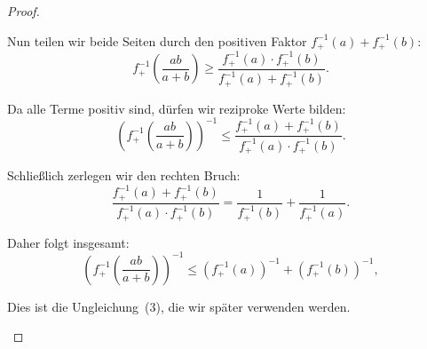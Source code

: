 \documentclass[
12pt,
fancyheadings, %
%
a4paper, 
%
]{tuhhreprt}
\begin{document}
\begin{proof}
\begin{enumerate}[label=\roman*)]
    Nun teilen wir beide Seiten durch den positiven Faktor \( f_+^{-1}(a) + f_+^{-1}(b) \):
    \[
    f_+^{-1}\left( \frac{ab}{a + b} \right) \geq \frac{f_+^{-1}(a) \cdot f_+^{-1}(b)}{f_+^{-1}(a) + f_+^{-1}(b)}.
    \]

    Da alle Terme positiv sind, dürfen wir reziproke Werte bilden:
    \[
    \left( f_+^{-1}\left( \frac{ab}{a + b} \right) \right)^{-1} \leq \frac{f_+^{-1}(a) + f_+^{-1}(b)}{f_+^{-1}(a) \cdot f_+^{-1}(b)}.
    \]

    Schließlich zerlegen wir den rechten Bruch:
    \[
    \frac{f_+^{-1}(a) + f_+^{-1}(b)}{f_+^{-1}(a) \cdot f_+^{-1}(b)} = \frac{1}{f_+^{-1}(b)} + \frac{1}{f_+^{-1}(a)}.
    \]

    Daher folgt insgesamt:
    \[
    \left( f_+^{-1}\left( \frac{ab}{a + b} \right) \right)^{-1}
    \leq \left( f_+^{-1}(a) \right)^{-1} + \left( f_+^{-1}(b) \right)^{-1},
    \]
    
    Dies ist die Ungleichung~(3), die wir später verwenden werden.

\end{enumerate}
\end{proof}
\end{document}
